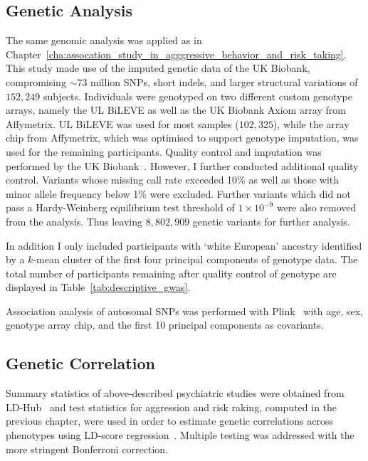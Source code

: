 \subsection{Genetic Analysis}
\label{sub:genetic_analysis}

The same genomic analysis was applied as in Chapter~\ref{cha:assocation_study_in_agggressive_behavior_and_risk_taking}.
This study made use of the imputed genetic data of the UK Biobank, compromising $\sim73$ million SNPs, short indels, and larger structural variations of $152,249$ subjects.
Individuals were genotyped on two different custom genotype arrays, namely the UL BiLEVE as well as the UK Biobank Axiom array from Affymetrix. 
UL BiLEVE was used for most samples ($102,325$), while the array chip from Affymetrix, which was optimised to support genotype imputation, was used for the remaining participants. 
Quality control and imputation was performed by the UK Biobank~\cite{Marchini2015}.
However, I further conducted additional quality control.
Variants whose missing call rate exceeded 10\% as well as those with minor allele frequency below 1\% were excluded.
Further variants which did not pass a Hardy-Weinberg equilibrium test threshold of $1\times10^{-9}$ were also removed from the analysis.
Thus leaving $8,802,909$ genetic variants for further analysis.

In addition I only included participants with `white European' ancestry identified by a $k$-mean cluster of the first four principal components of genotype data.
The total number of participants remaining after quality control of genotype are displayed in Table~\ref{tab:descriptive_gwas}.

Association analysis of autosomal SNPs was performed with Plink~\cite{Purcell2007,Chang2015} with age, sex, genotype array chip, and the first 10 principal components as covariants.

\subsection{Genetic Correlation}
\label{sub:genetic_correlation}

Summary statistics of above-described psychiatric studies were obtained from LD-Hub~\cite{ZHENG2016} and test statistics for aggression and risk raking, computed in the previous chapter, were used in order to estimate genetic correlations across phenotypes using LD-score regression~\cite{Bulik-Sullivan2015a}.
Multiple testing was addressed with the more stringent Bonferroni correction.



